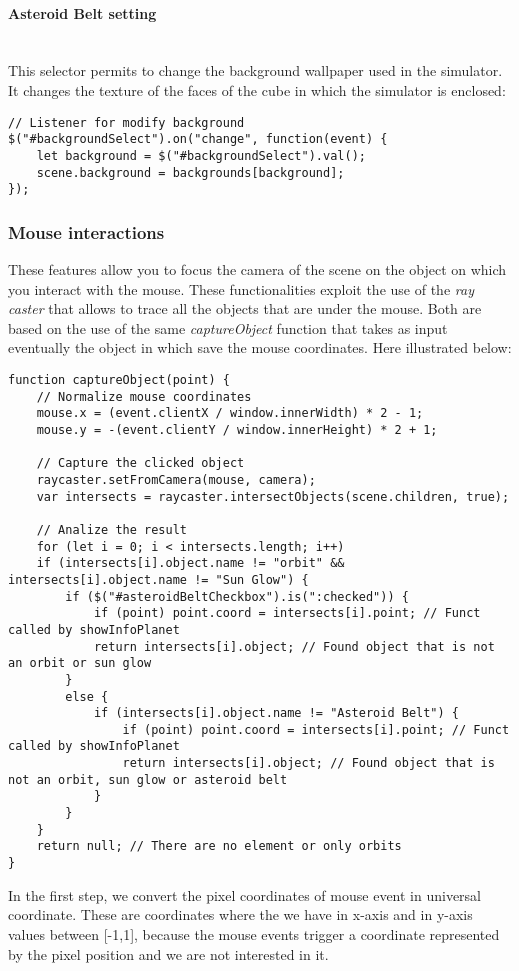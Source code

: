 \documentclass{article}
\begin{document}
\paragraph{Asteroid Belt setting}\mbox{}\\
This selector permits to change the background wallpaper used in the simulator. It changes the texture of the faces of the cube in which the simulator is enclosed:
\begin{lstlisting}
// Listener for modify background
$("#backgroundSelect").on("change", function(event) {
	let background = $("#backgroundSelect").val();
	scene.background = backgrounds[background];
});
\end{lstlisting}

\subsubsection{Mouse interactions}
These features allow you to focus the camera of the scene on the object on which you interact with the mouse. These functionalities exploit the use of the \textit{ray caster}\cite{documentation:threejs} that allows to trace all the objects that are under the mouse. Both are based on the use of the same \textit{captureObject} function that takes as input eventually the object in which save the mouse coordinates. Here illustrated below:
\begin{lstlisting}
function captureObject(point) {
	// Normalize mouse coordinates
	mouse.x = (event.clientX / window.innerWidth) * 2 - 1;
	mouse.y = -(event.clientY / window.innerHeight) * 2 + 1;
	
	// Capture the clicked object
	raycaster.setFromCamera(mouse, camera);
	var intersects = raycaster.intersectObjects(scene.children, true);
	
	// Analize the result
	for (let i = 0; i < intersects.length; i++)
	if (intersects[i].object.name != "orbit" && intersects[i].object.name != "Sun Glow") {
		if ($("#asteroidBeltCheckbox").is(":checked")) {
			if (point) point.coord = intersects[i].point; // Funct called by showInfoPlanet
			return intersects[i].object; // Found object that is not an orbit or sun glow
		}
		else {
			if (intersects[i].object.name != "Asteroid Belt") {
				if (point) point.coord = intersects[i].point; // Funct called by showInfoPlanet
				return intersects[i].object; // Found object that is not an orbit, sun glow or asteroid belt
			}
		}
	}
	return null; // There are no element or only orbits
}
\end{lstlisting}
\par In the first step, we convert the pixel coordinates of mouse event in universal coordinate. These are coordinates where the we have in x-axis and in y-axis values between [-1,1], because the mouse events trigger a coordinate represented by the pixel position and we are not interested in it.\\
\end{document}
